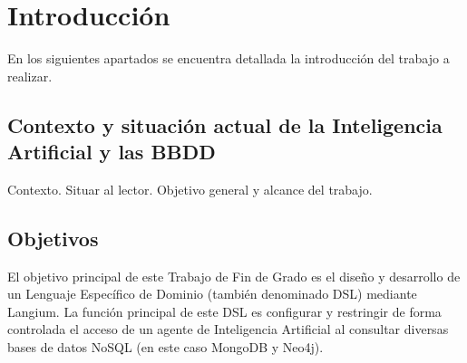 \documentclass[12pt,twoside,titlepage]{report}
\begin{document}



\pagestyle{fancy}


\renewcommand{\chaptermark}[1]{\markboth{Capítulo \thechapter.\ #1}{}}

\pagestyle{fancy}
\fancyhf{}
\fancyhead[LO]{\leftmark}
\fancyhead[RO]{}
\fancyhead[RE]{\nouppercase\rightmark}
\fancyhead[LE]{}
\fancyfoot[C]{\thepage}




\chapter{Introducción}


\pagestyle{fancy}


\setlength{\parskip}{0.75em}
\renewcommand{\baselinestretch}{1.25}
\setcounter{page}{1}



En los siguientes apartados se encuentra detallada la introducción del trabajo a realizar.


\section{Contexto y situación actual de la Inteligencia Artificial y las BBDD}

Contexto. Situar al lector. Objetivo general y alcance del trabajo.


\section{Objetivos}

El objetivo principal de este Trabajo de Fin de Grado es el diseño y desarrollo de un Lenguaje Específico de Dominio (también denominado DSL) mediante Langium. La función principal de este DSL es configurar y restringir de forma controlada el acceso de un agente de Inteligencia Artificial al consultar diversas bases de datos NoSQL (en este caso MongoDB y Neo4j).
\end{document}
